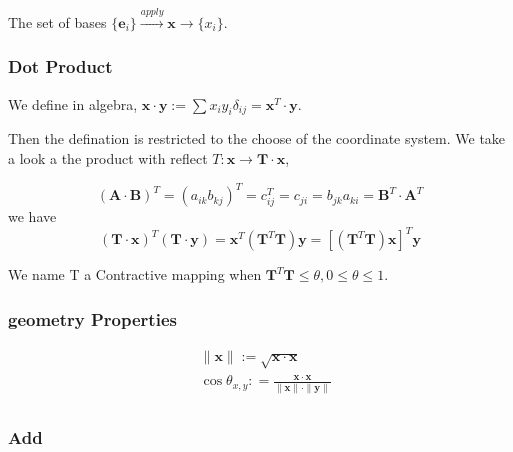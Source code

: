 \documentclass[UTF8]{../09-Mathematics}
\begin{document}
The set of bases $\{ \boldsymbol e_i  \}  \xrightarrow{apply} \boldsymbol{x} \longrightarrow    \{ x_i \}   $.


\subsubsection{Dot Product}

We define in algebra, $ \boldsymbol{x} \cdot \boldsymbol{y} := \sum{x_iy_i \delta _{ij}} = \boldsymbol{x}^T \cdot \boldsymbol{y}$.

Then the defination is restricted to the choose of the coordinate system. We take a look a the product with reflect $T : \boldsymbol x \rightarrow  \boldsymbol{T} \cdot \boldsymbol{x}$,

\begin{equation}
    (\boldsymbol A \cdot \boldsymbol  B)^T = (a_{ik}b_{kj})^T = c_{ij}^T = c_{ji} = b_{jk}a_{ki} = \boldsymbol B^T \cdot \boldsymbol A^T
\end{equation}
we have 
\begin{equation}
    (\boldsymbol T \cdot \boldsymbol  x)^T(\boldsymbol T \cdot \boldsymbol  y) =  \boldsymbol x^T (\boldsymbol T^T \boldsymbol T) \boldsymbol y = [(\boldsymbol T^T \boldsymbol T) \boldsymbol x]^T \boldsymbol y
\end{equation}

We name T a Contractive mapping when $\boldsymbol T^T \boldsymbol T \leqslant   \theta, 0 \leqslant \theta \leqslant 1$.

\subsubsection{geometry Properties}

\begin{equation}
    \begin{split}
    &\parallel \boldsymbol{x} \parallel := \sqrt{\boldsymbol x \cdot \boldsymbol x}\\
    &\cos {\theta_{x,y}} : = \frac
    {\boldsymbol x \cdot \boldsymbol x}
    {\parallel \boldsymbol{x} \parallel \cdot \parallel \boldsymbol{y} \parallel}\\
\end{split}
\end{equation}

\subsubsection{Add}
\end{document}
